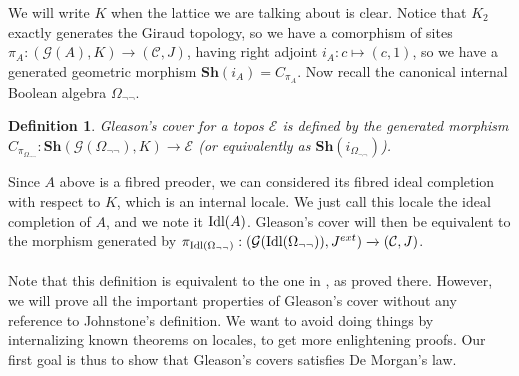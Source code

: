 \documentclass{article}
\newtheorem{definition}[theorem]{Definition}
\begin{document}
We will write $K$ when the lattice we are talking about is clear. Notice that $K_2$ exactly generates the Giraud topology, so we have a comorphism of sites $\pi_A:(\mathcal{G}(A),K)\xrightarrow{}(\mathcal{C},J)$, having right adjoint $i_A:c\mapsto (c,1)$, so we have a generated geometric morphism $\mathbf{Sh}(i_A)=C_{\pi_A}$. Now recall the canonical internal Boolean algebra $\Omega_{\neg\neg}$.

\begin{definition}
    Gleason's cover for a topos $\mathcal{E}$ is defined by the generated morphism $C_{\pi_{\Omega_{\neg\neg}}}:\mathbf{Sh}(\mathcal{G}(\Omega_{\neg\neg}),K)\xrightarrow{}\mathcal{E}$ (or equivalently as $\mathbf{Sh}(i_{\Omega_{\neg\neg}})$).
\end{definition}

Since $A$ above is a fibred preoder, we can considered its fibred ideal completion with respect to $K$, which is an internal locale. We just call this locale the ideal completion of $A$, and we note it $\textup{Idl}(A)$. Gleason's cover will then be equivalent to the morphism generated by $\pi_{\textup{Idl}(\Omega_{\neg\neg})}:(\mathcal{G}(\textup{Idl}(\Omega_{\neg\neg})),J^{ext})\xrightarrow{}(\mathcal{C},J)$.\\
\\
Note that this definition is equivalent to the one in \cite{johnstone1980gleason}, as proved there. However, we will prove all the important properties of Gleason's cover without any reference to Johnstone's definition. We want to avoid doing things by internalizing known theorems on locales, to get more enlightening proofs. Our first goal is thus to show that Gleason's covers satisfies De Morgan's law.
\end{document}
